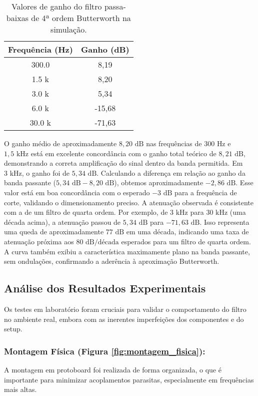\begin{table}[H]
\centering
\begin{tabular}{|c|c|}
\hline
\textbf{Frequência (Hz)} & \textbf{Ganho (dB)} \\
\hline
300.0 & 8,19 \\ \hline
1.5 k & 8,20 \\ \hline
3.0 k & 5,34 \\ \hline
6.0 k & -15,68 \\ \hline
30.0 k & -71,63 \\ \hline
\end{tabular}
\caption{Valores de ganho do filtro passa-baixas de 4ª ordem Butterworth na simulação.}
\label{tab:ganho_simulacao}
\end{table}

O ganho médio de aproximadamente $8,20 \text{ dB}$ nas frequências de $300 \text{ Hz}$ e $1,5 \text{ kHz}$ está em excelente concordância com o ganho total teórico de $8,21 \text{ dB}$, demonstrando a correta amplificação do sinal dentro da banda permitida.
Em $3 \text{ kHz}$, o ganho foi de $5,34 \text{ dB}$. Calculando a diferença em relação ao ganho da banda passante ($5,34 \text{ dB} - 8,20 \text{ dB}$), obtemos aproximadamente $-2,86 \text{ dB}$. Esse valor está em boa concordância com o esperado $-3 \text{ dB}$ para a frequência de corte, validando o dimensionamento preciso.
A atenuação observada é consistente com a de um filtro de quarta ordem. Por exemplo, de $3 \text{ kHz}$ para $30 \text{ kHz}$ (uma década acima), a atenuação passou de $5,34 \text{ dB}$ para $-71,63 \text{ dB}$. Isso representa uma queda de aproximadamente $77 \text{ dB}$ em uma década, indicando uma taxa de atenuação próxima aos $80 \text{ dB/década}$ esperados para um filtro de quarta ordem. A curva também exibiu a característica maximamente plano na banda passante, sem ondulações, confirmando a aderência à aproximação Butterworth.

\subsection{Análise dos Resultados Experimentais}
Os testes em laboratório foram cruciais para validar o comportamento do filtro no ambiente real, embora com as inerentes imperfeições dos componentes e do setup.

\subsubsection{Montagem Física (Figura \ref{fig:montagem_fisica}):} 
A montagem em protoboard foi realizada de forma organizada, o que é importante para minimizar acoplamentos parasitas, especialmente em frequências mais altas.

